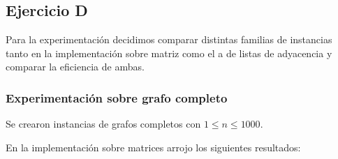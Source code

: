 \subsection{Ejercicio D}

Para la experimentación decidimos comparar distintas familias de instancias tanto en la implementación sobre matriz como el a de listas de adyacencia y comparar la eficiencia de ambas.

\subsubsection{Experimentación sobre grafo completo}

Se crearon instancias de grafos completos con $1 \leq n \leq 1000$.

En la implementación sobre matrices arrojo los siguientes resultados:\\ 

